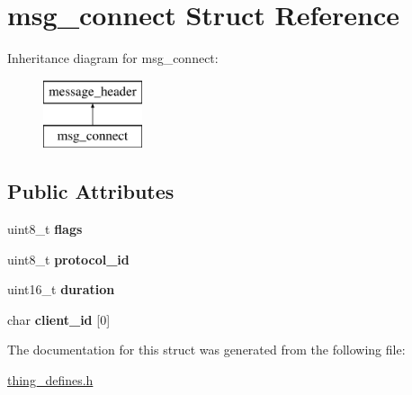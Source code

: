 \hypertarget{structmsg__connect}{\section{msg\-\_\-connect Struct Reference}
\label{structmsg__connect}
}
Inheritance diagram for msg\-\_\-connect\-:\begin{figure}[H]
\begin{center}
\leavevmode
\includegraphics[height=2.000000cm]{structmsg__connect}
\end{center}
\end{figure}
\subsection*{Public Attributes}
\begin{DoxyCompactItemize}
\item 
\hypertarget{structmsg__connect_a4fc0429270b074f1d074ba54bc4865dc}{uint8\-\_\-t {\bfseries flags}}\label{structmsg__connect_a4fc0429270b074f1d074ba54bc4865dc}

\item 
\hypertarget{structmsg__connect_a44a19851855343532dbbd64f35c96fae}{uint8\-\_\-t {\bfseries protocol\-\_\-id}}\label{structmsg__connect_a44a19851855343532dbbd64f35c96fae}

\item 
\hypertarget{structmsg__connect_a2b0f638095ccc0d4c408118c4a2cb0a2}{uint16\-\_\-t {\bfseries duration}}\label{structmsg__connect_a2b0f638095ccc0d4c408118c4a2cb0a2}

\item 
\hypertarget{structmsg__connect_a11a6095b393802c198d3e14e19f630ae}{char {\bfseries client\-\_\-id} \mbox{[}0\mbox{]}}\label{structmsg__connect_a11a6095b393802c198d3e14e19f630ae}

\end{DoxyCompactItemize}


The documentation for this struct was generated from the following file\-:\begin{DoxyCompactItemize}
\item 
\hyperlink{thing__defines_8h}{thing\-\_\-defines.\-h}\end{DoxyCompactItemize}
